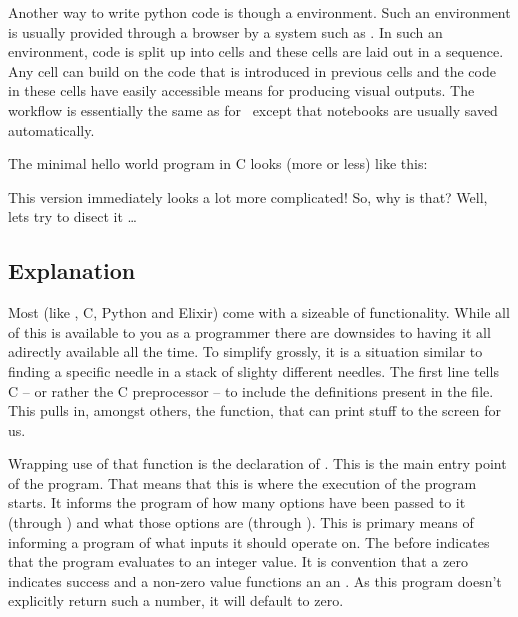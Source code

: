 Another way to write python code is though a  environment. Such an environment is usually provided through a browser by a system such as . In such an environment, code is split up into cells and these cells are laid out in a sequence. Any cell can build on the code that is introduced in previous cells and the code in these cells have easily accessible means for producing visual outputs. The workflow is essentially the same as for \csharp\ except that notebooks are usually saved automatically.


The minimal hello world program in C looks (more or less) like this:


This version immediately looks a lot more complicated! So, why is that? Well, lets try to disect it \ldots

\subsection{Explanation}

Most  (like \csharp, C, Python and Elixir) come with a sizeable  of functionality. While all of this is available to you as a programmer there are downsides to having it all adirectly available all the time. To simplify grossly, it is a situation similar to finding a specific needle in a stack of slighty different needles. The first line tells C -- or rather the C preprocessor -- to include the definitions present in the  file. This pulls in, amongst others, the  function, that can print stuff to the screen for us.

Wrapping use of that  function is the declaration of . This is the main entry point of the program. That means that this is where the execution of the program starts. It informs the program of how many options have been passed to it (through ) and what those options are (through ). This is  primary means of informing a program of what inputs it should operate on. The  before  indicates that the program evaluates to an integer value. It is convention that a zero indicates success and a non-zero value functions an an . As this program doesn't explicitly return such a number, it will default to zero.

